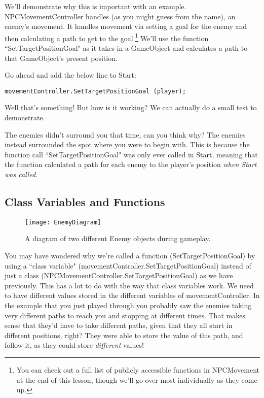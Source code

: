 \documentclass{article}
\begin{document}
We'll demonstrate why this is important with an example. NPCMovementController handles (as you might guess from the name), an enemy's movement. It handles movement via setting a goal for the enemy and then calculating a path to get to the goal.\footnote{You can check out a full list of publicly accessible functions in NPCMovement at the end of this lesson, though we'll go over most individually as they come up.} We'll use the function ``SetTargetPositionGoal" as it takes in a GameObject and calculates a path to that GameObject's present position.

Go ahead and add the below line to Start:

\lstset{style=sharpc}
\begin{lstlisting}
movementController.SetTargetPositionGoal (player);
\end{lstlisting} 

\noindent{}

Well that's something! But how is it working? We can actually do a small test to demonstrate. 

\noindent{}

The enemies didn't surround you that time, can you think why? The enemies instead surrounded the spot where you were to begin with. This is because the function call ``SetTargetPositionGoal" was only ever called in Start, meaning that the function calculated a path for each enemy to the player's position \textit{when Start was called}.

\subsection{Class Variables and Functions}

\begin{figure}
  \texttt{[image: EnemyDiagram]}
  \caption{A diagram of two different Enemy objects during gameplay.}
  \label{fig:EnemyDiagram}
\end{figure}

You may have wondered why we're called a function (SetTargetPositionGoal) by using a ``class variable" (movementController.SetTargetPositionGoal) instead of just a class (NPCMovementController.SetTargetPositionGoal) as we have previously. This has a lot to do with the way that class variables work. We need to have different values stored in the different variables of movementController. In the example that you just played through you probably saw the enemies taking very different paths to reach you and stopping at different times. That makes sense that they'd have to take different paths, given that they all start in different positions, right? They were able to store the value of this path, and follow it, as they could store \textit{different} values!
\end{document}
